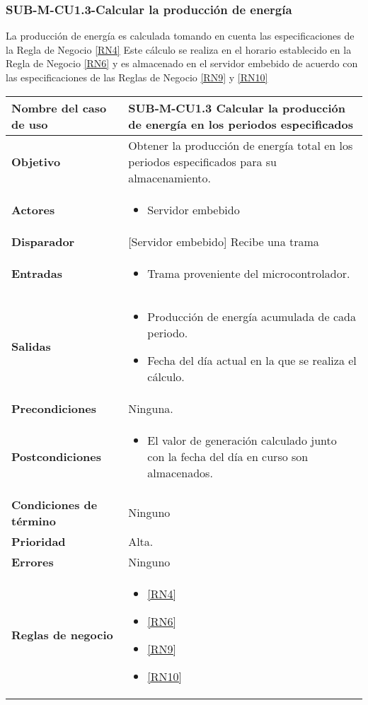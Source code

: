\subsubsection{SUB-M-CU1.3-Calcular la producción de energía}\label{SUB-M-CU1.3}
La producción de energía es calculada tomando en cuenta las especificaciones de la Regla de Negocio \ref{RN4} Este cálculo se realiza en el horario establecido en la Regla de Negocio \ref{RN6} y es almacenado en el servidor embebido de acuerdo con las especificaciones de las Reglas de Negocio \ref{RN9} y \ref{RN10}

\begin{longtable}{|J{5cm}|J{10.3cm}|}
	\hline
	\textbf{Nombre del caso de uso} &
		SUB-M-CU1.3 Calcular la producción de energía en los periodos especificados\\ \hline
	\textbf{Objetivo} &
		Obtener la producción de energía total en los periodos especificados para su almacenamiento. \\ \hline
	\textbf{Actores} &
		\begin{itemize}
		    \item Servidor embebido
		\end{itemize}\\ \hline 
	\textbf{Disparador} & 
	     {[Servidor embebido]} Recibe una trama\\ \hline 
	\textbf{Entradas} & 
		\begin{itemize}
				\item Trama proveniente del microcontrolador.
		\end{itemize}\\ \hline 
	\textbf{Salidas} & 
		\begin{itemize}
			\item Producción de energía acumulada de cada periodo.
			\item Fecha del día actual en la que se realiza el cálculo.
		\end{itemize} \\ \hline
	\textbf{Precondiciones} &
		Ninguna.\\ \hline
	\textbf{Postcondiciones} &
		\begin{itemize}
			\item El valor de generación calculado junto con la fecha del día en curso son almacenados.
		\end{itemize}\\ \hline
	\textbf{Condiciones de término} & 
		Ninguno \\ \hline 
	\textbf{Prioridad} & 
		Alta. \\ \hline
	\textbf{Errores} & 
	    Ninguno
		\\ \hline
	\textbf{Reglas de negocio} & 
		\begin{itemize}
			\item \ref{RN4}
			\item \ref{RN6}
			\item \ref{RN9}
			\item \ref{RN10}
		\end{itemize} \\ \hline

\end{longtable}

